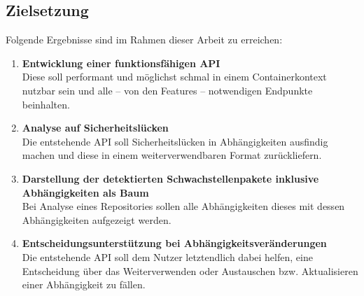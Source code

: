 \subsection{Zielsetzung} \label{sec:Zielsetzung}
    Folgende Ergebnisse sind im Rahmen dieser Arbeit zu erreichen:
    \begin{enumerate}
        \item \textbf{Entwicklung einer funktionsfähigen \ac{API}} \\
            Diese soll performant und möglichst schmal in einem Containerkontext nutzbar sein und alle -- von den Features -- notwendigen Endpunkte beinhalten.
        \item \textbf{Analyse auf Sicherheitslücken} \\
            Die entstehende \ac{API} soll Sicherheitslücken in Abhängigkeiten ausfindig machen und diese in einem weiterverwendbaren Format zurückliefern.
        \item \textbf{Darstellung der detektierten Schwachstellenpakete inklusive Abhängigkeiten als Baum} \\
            Bei Analyse eines Repositories sollen alle Abhängigkeiten dieses mit dessen Abhängigkeiten aufgezeigt werden.
        \item \textbf{Entscheidungsunterstützung bei Abhängigkeitsveränderungen} \\
            Die entstehende \ac{API} soll dem Nutzer letztendlich dabei helfen, eine Entscheidung über das Weiterverwenden oder Austauschen bzw. Aktualisieren einer Abhängigkeit zu fällen.
    \end{enumerate}